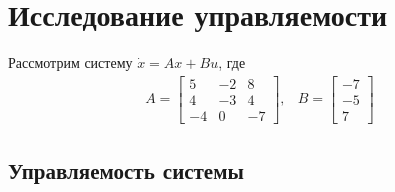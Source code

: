 \section{Исследование управляемости}

Рассмотрим систему $\dot{x} = Ax + Bu$, где 
\begin{equation}
    \begin{array}{cc}
        A = \begin{bmatrix}
            5 & -2 & 8 \\
            4 & -3 & 4 \\
            -4 & 0 & -7
        \end{bmatrix}, &
        B = \begin{bmatrix}
            -7 \\
            -5 \\
            7
        \end{bmatrix}
    \end{array}
\end{equation}

\subsection{Управляемость системы}
